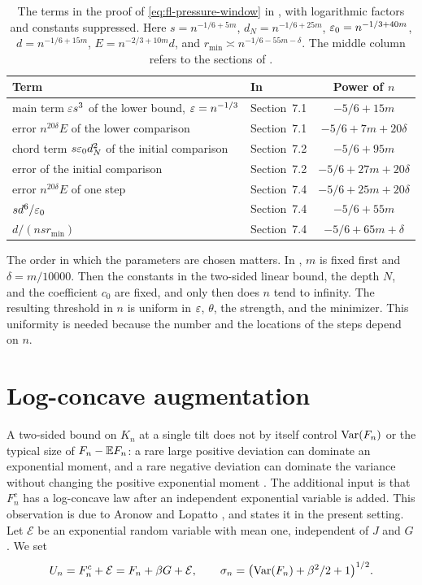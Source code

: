 \begin{table}[ht]
\centering
\caption{The terms in the proof of \eqref{eq:fl-pressure-window} in \cite[Section~7]{oai-fluctuations}, with logarithmic factors and constants suppressed. Here $s=n^{-1/6+5m}$, $d_N=n^{-1/6+25m}$, $\varepsilon_0=n^{-1/3+40m}$, $d=n^{-1/6+15m}$, $E=n^{-2/3+10m}d$, and $r_{\min}\asymp n^{-1/6-55m-\delta}$. The middle column refers to the sections of \cite{oai-fluctuations}.}
\label{t:fl-powers}
\begin{tabular}{@{}llc@{}}
\toprule
Term & In \cite{oai-fluctuations} & Power of $n$\\
\midrule
main term $\varepsilon s^3$ of the lower bound, $\varepsilon=n^{-1/3}$ & Section~7.1 & $-5/6+15m$\\
error $n^{20\delta}E$ of the lower comparison & Section~7.1 & $-5/6+7m+20\delta$\\
chord term $s\varepsilon_0d_N^2$ of the initial comparison & Section~7.2 & $-5/6+95m$\\
error of the initial comparison & Section~7.2 & $-5/6+27m+20\delta$\\
error $n^{20\delta}E$ of one step & Section~7.4 & $-5/6+25m+20\delta$\\
$sd^6/\varepsilon_0$ & Section~7.4 & $-5/6+55m$\\
$d/(nsr_{\min})$ & Section~7.4 & $-5/6+65m+\delta$\\
\bottomrule
\end{tabular}
\end{table}

The order in which the parameters are chosen matters. In \cite{oai-fluctuations}, $m$ is fixed first and $\delta=m/10000$. Then the constants in the two-sided linear bound, the depth $N$, and the coefficient $c_0$ are fixed, and only then does $n$ tend to infinity. The resulting threshold in $n$ is uniform in $\varepsilon$, $\theta$, the strength, and the minimizer. This uniformity is needed because the number and the locations of the steps depend on $n$.

\section{Log-concave augmentation}\label{sec:fl-logconcave}

A two-sided bound on $K_n$ at a single tilt does not by itself control $\operatorname{Var}(F_n)$ or the typical size of $F_n-\mathbb E F_n$: a rare large positive deviation can dominate an exponential moment, and a rare negative deviation can dominate the variance without changing the positive exponential moment \cite[Section~7.5]{oai-fluctuations}. The additional input is that $F_n^c$ has a log-concave law after an independent exponential variable is added. This observation is due to Aronow and Lopatto \cite[Proposition~5.1, proof, Steps~1 and~2]{quantitative-parisi}, and \cite[Lemma~7.6]{oai-fluctuations} states it in the present setting. Let $\mathcal E$ be an exponential random variable with mean one, independent of $J$ and $G$. We set
\begin{equation}\label{f:smoothing}
 U_n=F_n^c+\mathcal E=F_n+\beta G+\mathcal E,\qquad \sigma_n=\bigl(\operatorname{Var}(F_n)+\beta^2/2+1\bigr)^{1/2}.
\end{equation}

